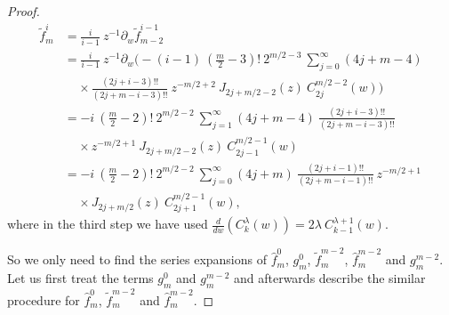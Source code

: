 \documentclass{amsart}
\theoremstyle{remark}
\begin{document}
\begin{proof}
\begin{align*}
\tilde{f}_m^i & = \frac{i}{i-1} \ z^{-1}\partial_w \tilde{f}_{m-2}^{i-1}\\
&= \frac{i}{i-1} \ z^{-1}\partial_w  \biggl( - (i-1) \ \left( \frac{m}{2}-3 \right)! \ 2^{m/2-3}  \  \sum_{j=0}^{\infty} (4j+m-4)\\
& \ \ \ \ \ \times \frac{(2j+i-3)!!}{(2j+m-i-3)!!} \ z^{-m/2+2} \ J_{2j+m/2-2}(z) \ C_{2j}^{m/2-2}(w) \biggr)\\
&=  - i \ \left( \frac{m}{2}-2 \right)! \ 2^{m/2-2}  \  \sum_{j=1}^{\infty} (4j+m-4) \  \frac{(2j+i-3)!!}{(2j+m-i-3)!!}\\
& \ \ \ \ \ \times z^{-m/2+1} \ J_{2j+m/2-2}(z) \ C_{2j-1}^{m/2-1}(w)\\
&= - i \ \left( \frac{m}{2}-2 \right)! \ 2^{m/2-2}  \  \sum_{j=0}^{\infty} (4j+m) \  \frac{(2j+i-1)!!}{(2j+m-i-1)!!} \ z^{-m/2+1}\\
& \ \ \ \ \ \times J_{2j+m/2}(z) \ C_{2j+1}^{m/2-1}(w),
\end{align*}
where in the third step we have used $\frac{d}{dw} \left( C_k^{\lambda}(w) \right) = 2 \lambda \ C_{k-1}^{\lambda + 1}(w)$. 

So we only need to find the series expansions of $\hat{f}_m^0$, $g_m^0$, $\tilde{f}_m^{m-2}$, $\hat{f}_m^{m-2}$ and $g_m^{m-2}$. Let us first treat the terms $g_m^0$ and $g_m^{m-2}$ and afterwards describe the similar procedure for $\hat{f}_m^0$, $\tilde{f}_m^{m-2}$ and $\hat{f}_m ^{m-2}$.


\end{proof}
\end{document}
